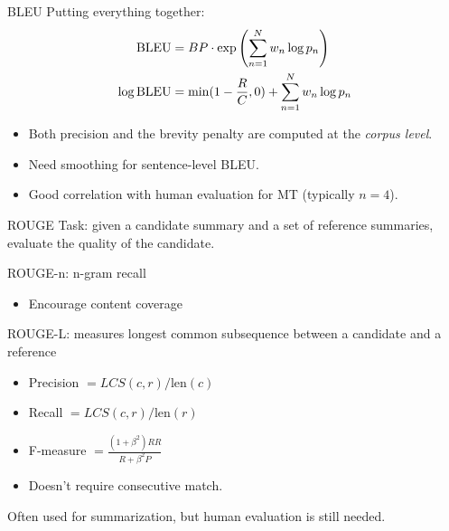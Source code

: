 \documentclass[usenames,dvipsnames,11pt,aspectratio=169]{beamer}
\begin{document}
\begin{frame}
    {BLEU}
    Putting everything together:
    \begin{align*}
        \text{BLEU} &= BP\cdot \exp\left( \sum_{n=1}^N w_n \log p_n \right) \\
        \log \text{BLEU} &= \min(1-\frac{R}{C}, 0) + \sum_{n=1}^N w_n \log p_n
    \end{align*}

    \begin{itemize}
        \item Both precision and the brevity penalty are computed at the \emph{corpus level}.
        \item Need smoothing for sentence-level BLEU.
        \item Good correlation with human evaluation for MT (typically $n=4$).
    \end{itemize}
\end{frame}

\begin{frame}
    {ROUGE}
    Task: given a candidate summary and a set of reference summaries, evaluate the quality of the candidate.

    ROUGE-n: n-gram recall\\
    \begin{itemize}
        \item Encourage content coverage 
    \end{itemize}

    ROUGE-L: measures longest common subsequence between a candidate and a reference\\
    \begin{itemize}
        \item Precision $ = LCS(c, r) / \text{len}(c)$
        \item Recall $ = LCS(c, r) / \text{len}(r)$
        \item F-measure $ = \frac{(1+\beta^2)RR}{R + \beta^2 P}$
        \item Doesn't require consecutive match.
    \end{itemize}

    Often used for summarization, but human evaluation is still needed.
\end{frame}
\end{document}
